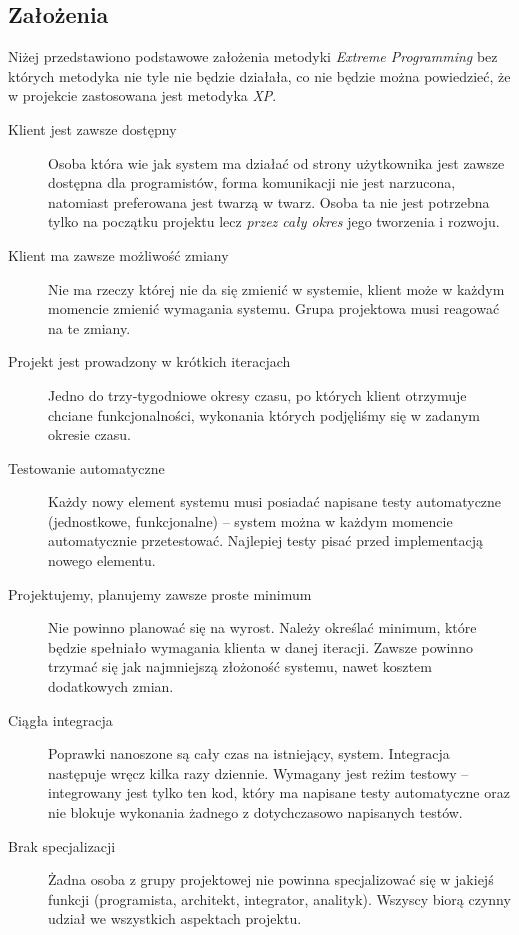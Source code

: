 \subsection{Założenia}
\label{sec:ZMTOzalozenia}

Niżej przedstawiono podstawowe założenia metodyki \textit{Extreme Programming} bez których metodyka nie tyle nie będzie działała, co nie będzie można powiedzieć, że w projekcie zastosowana jest metodyka \textit{XP}.

\begin{description}
    \item[Klient jest zawsze dostępny] Osoba która wie jak system ma działać od strony użytkownika jest zawsze dostępna dla programistów, forma komunikacji nie jest narzucona, natomiast preferowana jest twarzą w twarz. Osoba ta nie jest potrzebna tylko na początku projektu lecz \emph{przez cały okres} jego tworzenia i rozwoju.
    \item[Klient ma zawsze możliwość zmiany] Nie ma rzeczy której nie da się zmienić w systemie, klient może w każdym momencie zmienić wymagania systemu. Grupa projektowa musi reagować na te zmiany.
    \item[Projekt jest prowadzony w krótkich iteracjach] Jedno do trzy-tygodniowe okresy czasu, po których klient otrzymuje chciane funkcjonalności, wykonania których podjęliśmy się w zadanym okresie czasu.
    \item[Testowanie automatyczne] Każdy nowy element systemu musi posiadać napisane testy automatyczne (jednostkowe, funkcjonalne) -- system można w każdym momencie automatycznie przetestować. Najlepiej testy pisać przed implementacją nowego elementu.
    \item[Projektujemy, planujemy zawsze proste minimum] Nie powinno planować się na wyrost. Należy określać minimum, które będzie spełniało wymagania klienta w danej iteracji. Zawsze powinno trzymać się jak najmniejszą złożoność systemu, nawet kosztem dodatkowych zmian.
    \item[Ciągła integracja] Poprawki nanoszone są cały czas na istniejący, system. Integracja następuje wręcz kilka razy dziennie. Wymagany jest reżim testowy -- integrowany jest tylko ten kod, który ma napisane testy automatyczne oraz nie blokuje wykonania żadnego z dotychczasowo napisanych testów.
    \item[Brak specjalizacji] Żadna osoba z grupy projektowej nie powinna specjalizować się w jakiejś funkcji (programista, architekt, integrator, analityk). Wszyscy biorą czynny udział we wszystkich aspektach projektu.

\end{description}
